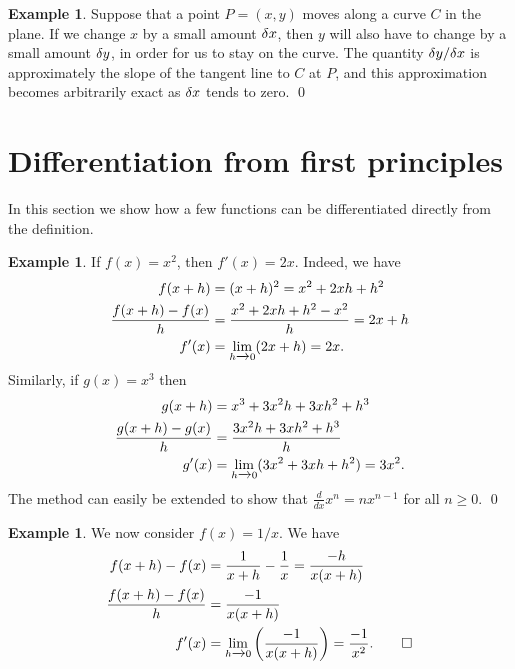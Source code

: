 \documentclass[a4paper]{book}
\theoremstyle{definition}
\newtheorem{example}[theorem]{Example}
\begin{document}
\begin{example}
 Suppose that a point $P=(x,y)$ moves along a curve $C$ in the plane.
 If we change $x$ by a small amount $\delta x$, then $y$ will also have
 to change by a small amount $\delta y$, in order for us to stay on the
 curve.  The quantity $\delta y/\delta x$ is approximately the slope of the
 tangent line to $C$ at $P$, and this approximation becomes
 arbitrarily exact as $\delta x$ tends to zero. \qed
\end{example}

\section{Differentiation from first principles}
\label{sec-diff-limit}

In this section we show how a few functions can be differentiated
directly from the definition.

\begin{example}
 If $f(x)=x^2$, then $f'(x)=2x$.  Indeed, we have
 \begin{align*}
  f(x+h) &= (x+h)^2 = x^2 + 2xh + h^2 \\
  \frac{f(x+h)-f(x)}{h}
   &= \frac{x^2+2xh+h^2-x^2}{h} = 2x + h \\
  f'(x) &= \lim_{h\xrightarrow{}0}(2x+h) = 2x.
 \end{align*}
 Similarly, if $g(x)=x^3$ then
 \begin{align*}
  g(x+h) &= x^3 + 3x^2h + 3xh^2 + h^3 \\
  \frac{g(x+h)-g(x)}{h}
   &= \frac{3x^2h+3xh^2+h^3}{h} \\
  g'(x) &= \lim_{h\xrightarrow{}0}(3x^2 + 3xh + h^2) = 3x^2.
 \end{align*}
 The method can easily be extended to show that
 $\frac{d}{dx}x^n=nx^{n-1}$ for all $n\geq 0$. \qed
\end{example}

\begin{example}
 We now consider $f(x)=1/x$.  We have
 \begin{align*}
  f(x+h) - f(x) &= \frac{1}{x+h} - \frac{1}{x} = \frac{-h}{x(x+h)} \\
  \frac{f(x+h)-f(x)}{h} &= \frac{-1}{x(x+h)} \\
  f'(x) &= \lim_{h\xrightarrow{}0} \left(\frac{-1}{x(x+h)}\right) 
         = \frac{-1}{x^2}. \qed
 \end{align*}
\end{example}
\end{document}
